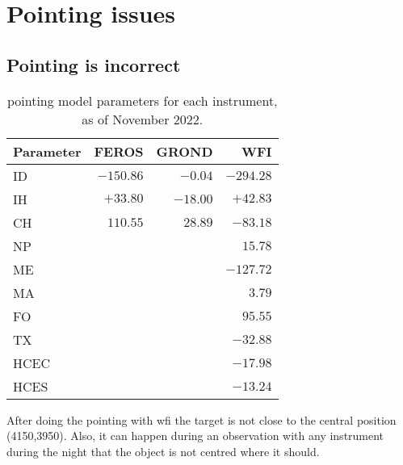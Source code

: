 \documentclass[11pt,fleqn,a4paper]{book}
\begin{document}
\section{Pointing issues}

\subsection{Pointing is incorrect}
\label{sec:trouble:pointing}
\begin{table}[!bt]
\centering
\caption[Pointing model parameters for each instrument]{\Gls{pointing model} parameters for each instrument, as of November 2022.}
\label{tab:pointingmodelcoeff}
\small
\begin{tabular}{lrrr}
\hline\hline
Parameter & FEROS      & GROND     & WFI\\\hline
ID        & $-150.86$  & $-0.04$ & $-294.28$\\
IH        & $+33.80$  & $-18.00$ & $+42.83$\\
CH        & $ 110.55$  & $28.89$ & $ -83.18$\\\hline
NP        & \multicolumn{3}{r}{$15.78$}\\
ME        & \multicolumn{3}{r}{$-127.72$}\\
MA        & \multicolumn{3}{r}{$3.79$}\\
FO        & \multicolumn{3}{r}{$95.55$}\\
TX        & \multicolumn{3}{r}{$-32.88$}\\
HCEC      & \multicolumn{3}{r}{$-17.98$}\\
HCES      & \multicolumn{3}{r}{$-13.24$}\\\hline
\end{tabular}
\end{table}

After doing the \gls{pointing} with \gls{wfi} the target is not close to the central position (4150,3950).  Also, it can happen during an observation with any instrument during the night that the object is not centred where it should.
\end{document}
